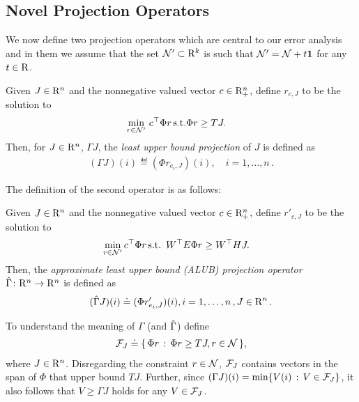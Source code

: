 \subsection{Novel Projection Operators}
We now define two projection operators which are central to our error analysis and in them we assume that the set $\mathcal{N}'\subset \mathrm{R}^k$ is such that $\mathcal{N}' = \mathcal{N} + t \mathbf{1}$ for any $t\in \mathrm{R}$.
\begin{definition}\label{lubpop}
Given $J\in \mathrm{R}^n$ and the nonnegative valued vector $c\in \mathrm{R}^n_+$, define $r_{c,J}$ to be the solution to
\begin{align}
\label{lubplp}
\begin{split}
\underset{r\in \N'}{\min} &\,\, c^\top \Phi r\,\mb
\text{s.t.} \mb \Phi r\geq  TJ.
\end{split}
\end{align}
Then, for $J\in \mathrm{R}^n$, $\Gamma J$,
the \emph{ least upper bound projection} of $J$ is defined as
\begin{align}\label{gamdef}
(\Gamma J)(i)\eqdef(\Phi r_{e_i,J})(i),\quad i=1,\ldots,n\,.
\end{align}
\end{definition}

The definition of the second operator is as follows:
\begin{definition}\label{alubpop}
Given $J\in \mathrm{R}^n$ and the nonnegative valued vector $c\in \mathrm{R}^n_+$, define $r'_{c,J}$ to be the solution to
\begin{align}\label{alubplp}
\underset{r\in \N'}{\min}& \,\mb c^\top \Phi r\,\mb
\text{s.t.} \,\,\, W^\top E \Phi r\geq W^\top HJ.
\end{align}
Then, the \emph{approximate least upper bound (ALUB) projection operator}
$\hat{\Gamma} \colon \mathrm{R}^n \rightarrow \mathrm{R}^n$ is defined as
\begin{align}\label{tgamdef}
(\hg J)(i)\eqdef(\Phi r'_{e_i,J})(i), \mb i=1,\ldots,n\,, J\in \R^n\,.
\end{align}
\end{definition}
\begin{remark}\label{ubrem}
To understand the meaning of $\Gamma$ (and $\hat{\Gamma}$) define
\begin{align}\label{ubclass}
\F_J\eqdef\{\,\Phi r\,:\,\Phi r\geq TJ, r\in \N\,\},
\end{align}
where $J\in \mathrm{R}^n$.
Disregarding the constraint $r\in \mathcal{N}$,
$\mathcal{F}_J$ contains vectors in the span of $\Phi$ that upper bound $TJ$. Further, since $(\Gamma J)(i) = \min\{ V(i) \,:\, V\in \mathcal{F}_J \}$, it also follows that $ V\ge \Gamma J $ holds for any $V\in \mathcal{F}_J$.
\end{remark}

